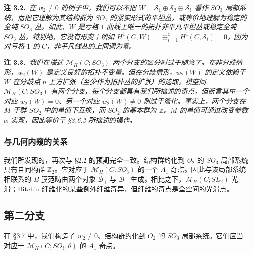 \documentclass[11pt,a4paper]{article}
\begin{document}
\par\medskip
\noindent\textbf{注 3.2.}\ \textit{在 $w_2\ne0$ 的例子中，我们可以不把 $W=\mathcal{S}_1\oplus\mathcal{S}_2\oplus\mathcal{S}_3$ 看作 $SO_3$ 局部系统，而把它理解为其结构群为 $SO_3$ 的紧实形式的平坦丛，或等价地理解为稳定的全纯 $SO_3$ 丛。如此，$W$ 是亏格 $1$ 曲线上唯一的拓扑非平凡平坦丛或稳定全纯 $SO_3$ 丛。特别地，它没有形变；例如 $H^1(C,W)=\oplus_{i=1}^3H^1(C,\mathcal{S}_i)=0$，因为对亏格 $1$ 的 $C$，非平凡线丛的上同调为零。}
\par\medskip

\par\medskip
\noindent\textbf{注 3.3.}\ \textit{我们在描述 $\mathcal{M}_H(C;SO_3)$ 两个分支的区分时过于随意了。在非分歧情形，$w_2(W)$ 是定义良好的拓扑不变量。但在分歧情形，$w_2(W)$ 的定义依赖于 $W$ 在分歧点 $p$ 上方扩张（至少作为拓扑丛的扩张）的选取。模空间 $\mathcal{M}_H(C;SO_3)$ 有两个分支，每个分支都具有我们所描述的奇点，但断言其中一个对应 $w_2(W)=0$、另一个对应 $w_2(W)\ne0$ 则过于简化。事实上，两个分支在 $M$ 于群 $SO_2$ 中的单值下互换，而 $SO_2$ 的基本群为 $\mathbb{Z}$。$M$ 的单值可通过改变参数 $\alpha$ 实现，因此等价于 §3.6.2 所描述的操作。}
\par\medskip

\subsubsection{与几何内窥的关系}

我们所发现的，再次与 §2.2 的预期完全一致。结构群约化到 $O_2$ 的 $SO_3$ 局部系统具有自同构群 $\mathbb{Z}_2$。它对应于 $\mathcal{M}_H(C;SO_3)$ 的一个 $A_1$ 奇点。因此与该局部系统相联系的 $B$-膜范畴由两个对象 $\mathcal{B}_+$ 与 $\mathcal{B}_-$ 生成。相比之下，$\mathcal{M}_H(C;SL_2)$ 光滑；Hitchin 纤维化的某些例外纤维奇异，但纤维的奇点是全空间的光滑点。

\subsection{第二分支}

在 §3.7 中，我们构造了 $w_2\ne0$、结构群约化到 $O_2$ 的 $SO_3$ 局部系统。它们应当对应于 $\mathcal{M}_H(C;SO_3,\theta)$ 的 $A_1$ 奇点。

\end{document}
